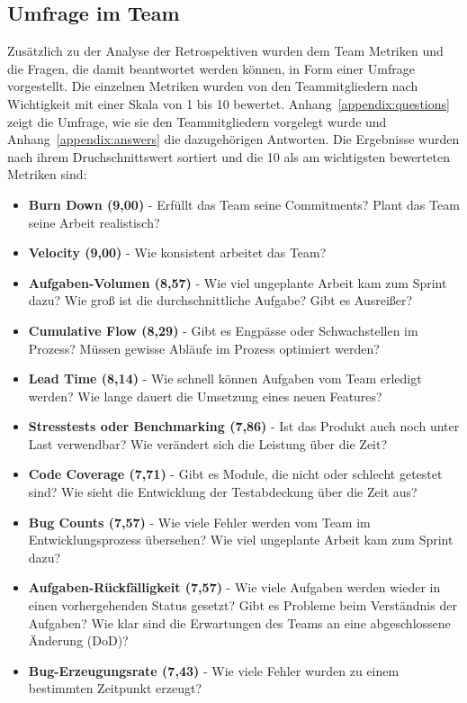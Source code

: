 \subsection{Umfrage im Team}

Zusätzlich zu der Analyse der Retrospektiven wurden dem Team Metriken und die Fragen, die damit beantwortet werden können, in Form einer Umfrage vorgestellt.
Die einzelnen Metriken wurden von den Teammitgliedern nach Wichtigkeit mit einer Skala von 1 bis 10 bewertet.
Anhang~\ref{appendix:questions} zeigt die Umfrage, wie sie den Teammitgliedern vorgelegt wurde und Anhang~\ref{appendix:answers} die dazugehörigen Antworten.
Die Ergebnisse wurden nach ihrem Druchschnittswert sortiert und die 10 als am wichtigsten bewerteten Metriken sind:

\begin{itemize}[noitemsep]
    \item \textbf{Burn Down (9,00)} \mbox{-} Erfüllt das Team seine Commitments? Plant das Team seine Arbeit realistisch?
    \item \textbf{Velocity (9,00)} \mbox{-} Wie konsistent arbeitet das Team?
    \item \textbf{Aufgaben-Volumen (8,57)} \mbox{-} Wie viel ungeplante Arbeit kam zum Sprint dazu? Wie groß ist die durchschnittliche Aufgabe? Gibt es Ausreißer?
    \item \textbf{Cumulative Flow (8,29)} \mbox{-} Gibt es Engpässe oder Schwachstellen im Prozess? Müssen gewisse Abläufe im Prozess optimiert werden?
    \item \textbf{Lead Time (8,14)} \mbox{-} Wie schnell können Aufgaben vom Team erledigt werden? Wie lange dauert die Umsetzung eines neuen Features?
    \item \textbf{Stresstests oder Benchmarking (7,86)} \mbox{-} Ist das Produkt auch noch unter Last verwendbar? Wie verändert sich die Leistung über die Zeit?
    \item \textbf{Code Coverage (7,71)} \mbox{-} Gibt es Module, die nicht oder schlecht getestet sind? Wie sieht die Entwicklung der Testabdeckung über die Zeit aus?
    \item \textbf{Bug Counts (7,57)} \mbox{-} Wie viele Fehler werden vom Team im Entwicklungsprozess übersehen? Wie viel ungeplante Arbeit kam zum Sprint dazu?
    \item \textbf{Aufgaben-Rückfälligkeit (7,57)} \mbox{-} Wie viele Aufgaben werden wieder in einen vorhergehenden Status gesetzt? Gibt es Probleme beim Verständnis der Aufgaben? Wie klar sind die Erwartungen des Teams an eine abgeschlossene Änderung (DoD)?
    \item \textbf{Bug-Erzeugungsrate (7,43)} \mbox{-} Wie viele Fehler wurden zu einem bestimmten Zeitpunkt erzeugt?
\end{itemize}

